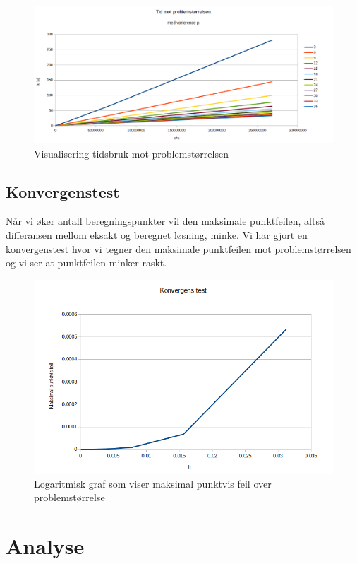 \documentclass[11pt,norsk,a4paper]{article}
\begin{document}
\begin{figure}[h]
\centering
\includegraphics[scale=0.4]{plot_tid_p.png}
\caption{Visualisering tidsbruk mot problemstørrelsen}
\end{figure}



\subsection{Konvergenstest}
Når vi øker antall beregningspunkter vil den maksimale punktfeilen, altså differansen mellom eksakt og beregnet løsning, minke. Vi har gjort en konvergenstest hvor vi tegner den maksimale punktfeilen mot problemstørrelsen og vi ser at punktfeilen minker raskt.

\begin{figure}[h]
\centering
\includegraphics[scale=0.5]{plot_konvergens.png}
\caption{Logaritmisk graf som viser maksimal punktvis feil over problemstørrelse}
\end{figure}


\section{Analyse}
\end{document}
